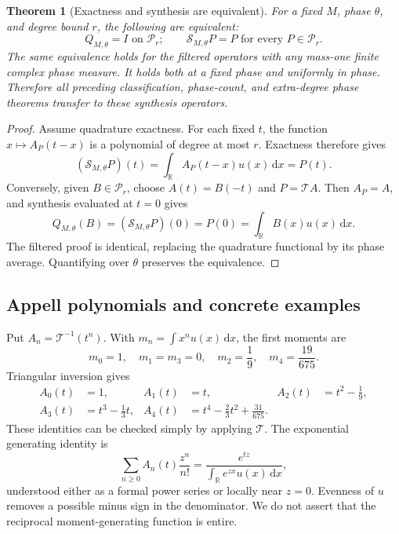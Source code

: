 \documentclass[11pt,a4paper]{article}
\numberwithin{equation}{section}
\theoremstyle{plain}
\newtheorem{theorem}{Theorem}[section]
\theoremstyle{definition}
\theoremstyle{remark}
\newcommand{\R}{\mathbb R}
\newcommand{\dd}{\,\mathrm d}
\newcommand{\Poly}{\mathcal P}
\begin{document}
\begin{theorem}[Exactness and synthesis are equivalent]\label{thm:synthesis}
For a fixed $M$, phase $\theta$, and degree bound $r$, the following are
equivalent:
\[
 Q_{M,\theta}=I\text{ on }\Poly_r;
 \qquad
 \mathcal S_{M,\theta}P=P\text{ for every }P\in\Poly_r.
\]
The same equivalence holds for the filtered operators with any mass-one
finite complex phase measure. It holds both at a fixed phase and uniformly
in phase. Therefore all preceding classification, phase-count, and
extra-degree phase theorems transfer to these synthesis operators.
\end{theorem}
\begin{proof}
Assume quadrature exactness. For each fixed $t$, the function
$x\mapsto A_P(t-x)$ is a polynomial of degree at most $r$. Exactness
therefore gives
\[
 (\mathcal S_{M,\theta}P)(t)
 =\int_\R A_P(t-x)u(x)\dd x=P(t).
\]
Conversely, given $B\in\Poly_r$, choose $A(t)=B(-t)$ and
$P=\mathcal T A$. Then $A_P=A$, and synthesis evaluated at $t=0$ gives
\[
 Q_{M,\theta}(B)
 =(\mathcal S_{M,\theta}P)(0)=P(0)
 =\int_\R B(x)u(x)\dd x.
\]
The filtered proof is identical, replacing the quadrature functional by
its phase average. Quantifying over $\theta$ preserves the equivalence.
\end{proof}

\subsection{Appell polynomials and concrete examples}

Put $A_n=\mathcal T^{-1}(t^n)$. With
$m_n=\int x^n u(x)\dd x$, the first moments are
\[
 m_0=1,\quad m_1=m_3=0,\quad m_2=\frac19,
 \quad m_4=\frac{19}{675}.
\]
Triangular inversion gives
\begin{align*}
 A_0(t)&=1,& A_1(t)&=t,& A_2(t)&=t^2-\frac19,\\
 A_3(t)&=t^3-\frac13t,&
 A_4(t)&=t^4-\frac23t^2+\frac{31}{675}.
\end{align*}
These identities can be checked simply by applying $\mathcal T$.
The exponential generating identity is
\begin{equation}\label{eq:Appell}
 \sum_{n\ge0}A_n(t)\frac{z^n}{n!}
 =\frac{e^{tz}}{\int_\R e^{zx}u(x)\dd x},
\end{equation}
understood either as a formal power series or locally near $z=0$.
Evenness of $u$ removes a possible minus sign in the denominator. We do
not assert that the reciprocal moment-generating function is entire.
\end{document}
